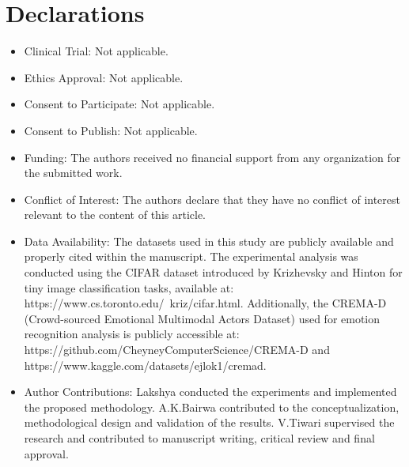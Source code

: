 \documentclass[fleqn,10pt]{wlscirep}
\begin{document}
\section*{Declarations}
\begin{itemize}
\item Clinical Trial: Not applicable.
\item Ethics Approval: Not applicable.
\item Consent to Participate: Not applicable.
\item Consent to Publish: Not applicable.
\item Funding: The authors received no financial support from any organization for the submitted work.
\item Conflict of Interest: The authors declare that they have no conflict of interest relevant to the content of this article.
\item Data Availability: The datasets used in this study are publicly available and properly cited within the manuscript. The experimental analysis was conducted using the CIFAR dataset introduced by Krizhevsky and Hinton for tiny image classification tasks, available at: https://www.cs.toronto.edu/~kriz/cifar.html. Additionally, the CREMA-D (Crowd-sourced Emotional Multimodal Actors Dataset) used for emotion recognition analysis is publicly accessible at: https://github.com/CheyneyComputerScience/CREMA-D and https://www.kaggle.com/datasets/ejlok1/cremad.
\item Author Contributions: Lakshya conducted the experiments and implemented the proposed methodology. A.K.Bairwa contributed to the conceptualization, methodological design and validation of the results. V.Tiwari supervised the research and contributed to manuscript writing, critical review and final approval.
\end{itemize}


\end{document}
